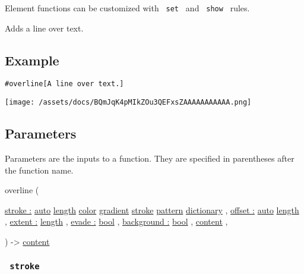 \label{element-tooltip}
Element functions can be customized with \texttt{\ set\ } and
\texttt{\ show\ } rules.

Adds a line over text.

\subsection{Example}\label{example}

\begin{verbatim}
#overline[A line over text.]
\end{verbatim}

\texttt{[image: /assets/docs/BQmJqK4pMIkZOu3QEFxsZAAAAAAAAAAA.png]}

\subsection{\texorpdfstring{{ Parameters
}}{ Parameters }}\label{parameters}

\label{parameters-tooltip}
Parameters are the inputs to a function. They are specified in
parentheses after the function name.

{ overline } (

{ \hyperref[parameters-stroke]{stroke :}
\href{/docs/reference/foundations/auto/}{auto}
\href{/docs/reference/layout/length/}{length}
\href{/docs/reference/visualize/color/}{color}
\href{/docs/reference/visualize/gradient/}{gradient}
\href{/docs/reference/visualize/stroke/}{stroke}
\href{/docs/reference/visualize/pattern/}{pattern}
\href{/docs/reference/foundations/dictionary/}{dictionary} , } {
\hyperref[parameters-offset]{offset :}
\href{/docs/reference/foundations/auto/}{auto}
\href{/docs/reference/layout/length/}{length} , } {
\hyperref[parameters-extent]{extent :}
\href{/docs/reference/layout/length/}{length} , } {
\hyperref[parameters-evade]{evade :}
\href{/docs/reference/foundations/bool/}{bool} , } {
\hyperref[parameters-background]{background :}
\href{/docs/reference/foundations/bool/}{bool} , } {
\href{/docs/reference/foundations/content/}{content} , }

) -\textgreater{} \href{/docs/reference/foundations/content/}{content}

\subsubsection{\texorpdfstring{\texttt{\ stroke\ }}{ stroke }}\label{parameters-stroke}

